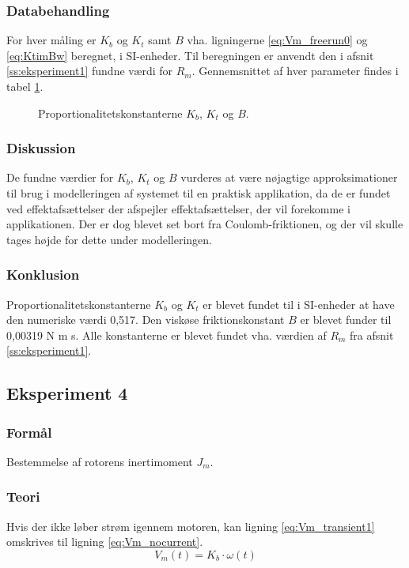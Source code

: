 \subsubsection{Databehandling}
For hver måling er $K_b$ og $K_t$ samt $B$ vha. ligningerne \ref{eq:Vm_freerun0} og \ref{eq:KtimBw} beregnet,
i SI-enheder. Til beregningen er anvendt den i afsnit \ref{ss:eksperiment1} fundne værdi for $R_m$.
Gennemsnittet af hver parameter findes i tabel \ref{tb:kbktb}.
\begin{figure}[th!]
	\centering
	
	\captionsetup{type=table}
	\caption[Proportionalitetskonstanterne $K_b$, $K_t$ og $B$]
			{Proportionalitetskonstanterne $K_b$, $K_t$ og $B$.}
	\label{tb:kbktb}
\end{figure}

\subsubsection{Diskussion}
De fundne værdier for $K_b$, $K_t$ og $B$ vurderes at være nøjagtige approksimationer
til brug i modelleringen af systemet til en praktisk applikation, da de er fundet ved effektafsættelser
der afspejler effektafsættelser, der vil forekomme i applikationen.
Der er dog blevet set bort fra Coulomb-friktionen, og der vil skulle tages højde for dette under modelleringen.
\subsubsection{Konklusion}
Proportionalitetskonstanterne $K_b$ og $K_t$ er blevet fundet til i SI-enheder at have den numeriske værdi 0,517.
Den viskøse friktionskonstant $B$ er blevet funder til 0,00319 N m s.
Alle konstanterne er blevet fundet vha. værdien af $R_m$ fra afsnit \ref{ss:eksperiment1}.
\subsection{Eksperiment 4}
\subsubsection{Formål}
Bestemmelse af rotorens inertimoment $J_m$.
\subsubsection{Teori}
Hvis der ikke løber strøm igennem motoren,
kan ligning \ref{eq:Vm_transient1} omskrives til ligning \ref{eq:Vm_nocurrent}.
\begin{equation}
	V_m(t)=K_b\cdot\omega(t)
	\label{eq:Vm_nocurrent}
 \end{equation}

